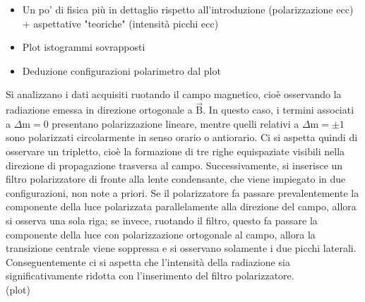 \documentclass[twocolumn,10pt]{asme2ej}
\begin{document}
\begin{itemize}
    \item Un po' di fisica più in dettaglio rispetto all'introduzione (polarizzazione ecc) + aspettative "teoriche"
    (intensità picchi ecc)
    \item Plot istogrammi sovrapposti 
    \item Deduzione configurazioni polarimetro dal plot 
\end{itemize}
Si analizzano i dati acquisiti ruotando il campo magnetico, cioè osservando la radiazione emessa 
in direzione ortogonale a $\vec{\text{B}}$. In questo caso, i termini associati a $\Delta \text{m} = 0$ presentano polarizzazione lineare, 
mentre quelli relativi a $\Delta \text{m} = \pm 1$ sono polarizzati circolarmente in senso orario o antiorario. 
Ci si aspetta quindi di osservare un tripletto, cioè la formazione di tre righe equispaziate visibili nella direzione 
di propagazione trasversa al campo. Successivamente, si inserisce un filtro polarizzatore di fronte alla lente condensante, che viene impiegato in due configurazioni, non note a priori. 
Se il polarizzatore fa passare prevalentemente la componente della luce polarizzata parallelamente alla direzione del campo, allora si osserva una sola riga; se invece, ruotando il filtro, questo 
fa passare la componente della luce con polarizzazione ortogonale al campo, allora la transizione centrale viene soppressa e si osservano solamente i due picchi laterali.
Conseguentemente ci si aspetta che l'intensità della radiazione sia significativamente ridotta con l'inserimento del filtro polarizzatore.  
\\ (plot)
\end{document}
